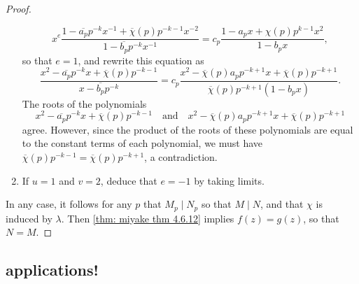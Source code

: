\documentclass[10pt,leqno,twoside]{article}
\theoremstyle{plain}
\theoremstyle{definition}
\numberwithin{equation}{section}
\numberwithin{lem}{section}
\newcommand{\sai}[1]{\textcolor{red}{#1}}
\begin{document}
\begin{proof}
\begin{enumerate}[label=(\arabic*)]
        \[x^e\frac{1-\overline{a_p}p^{-k}x^{-1} + \overline{\chi}(p)p^{-k-1}x^{-2}}{1-\overline{b_p}p^{-k}x^{-1}} = c_p\frac{1-a_px + \chi(p)p^{k-1}x^2}{1-b_px},\] so that $e = 1$, and rewrite this equation as 
        \[\frac{x^2-\overline{a_p}p^{-k}x + \overline \chi(p)p^{-k-1}}{x-\overline{b_p}p^{-k}} = c_p\frac{x^2-\overline\chi(p)a_pp^{-k+1}x + \overline\chi(p)p^{-k+1}}{\overline\chi(p)p^{-k+1}(1-b_px)}.\] The roots of the polynomials 
        \[x^2-\overline{a_p}p^{-k}x + \overline \chi(p)p^{-k-1}\quad \text{and}\quad x^2-\overline\chi(p)a_pp^{-k+1}x + \overline\chi(p)p^{-k+1}\] agree. However, since the product of the roots of these polynomials are equal to the constant terms of each polynomial, we must have $\overline \chi(p)p^{-k-1} = \overline\chi(p)p^{-k+1}$, a contradiction. 
        
        \item If $u = 1$ and $v = 2$, deduce that $e = -1$ by taking limits.
    \end{enumerate}
    In any case, it follows for any $p$ that $M_p\mid N_p$ so that $M\mid N$, and that $\chi$ is induced by $\lambda$. Then \cref{thm: miyake thm 4.6.12} implies $f(z) = g(z)$, so that $N = M$.
\end{proof}
\subsection{applications!}

\end{document}
